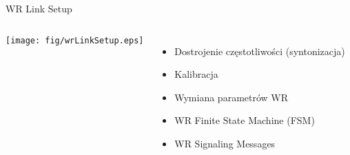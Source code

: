 \documentclass[compress,red]{beamer}
\begin{document}
\begin{frame}{WR Link Setup }

  \begin{columns}[c]

      \begin{center}
      \texttt{[image: fig/wrLinkSetup.eps]}
      \end{center}



      \begin{itemize}
	\item Dostrojenie częstotliwości (syntonizacja)
	\item Kalibracja
	\item Wymiana parametrów WR
	\item WR Finite State Machine (FSM)
	\item WR Signaling Messages
      \end{itemize}

  \end{columns}

\end{frame}
% 
% 
% 
\end{document}
